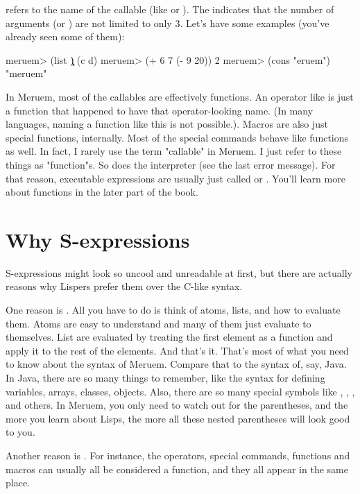  refers to the name of the callable (like  or \code{++}). The  indicates that the number of arguments (or ) are not limited to only 3. Let's have some examples (you've already seen some of them):

\begin{REPL}
meruem> (list \c \d)
(c d)
meruem> (+ 6 7 (- 9 20))
2
meruem> (cons \m "eruem")
"meruem"
\end{REPL}

In Meruem, most of the callables are effectively functions. An operator like \code{+} is just a function that happened to have that operator-looking name. (In many languages, naming a function like this is not possible.). Macros are also just special functions, internally. Most of the special commands behave like functions as well. In fact, I rarely use the term "callable" in Meruem. I just refer to these things as "function"s. So does the interpreter (see the last error message). For that reason, executable expressions are usually just called  or . You'll learn more about functions in the later part of the book.

\section{Why S-expressions}
S-expressions might look so uncool and unreadable at first, but there are actually reasons why Lispers prefer them over the C-like syntax. 

One reason is . All you have to do is think of atoms, lists, and how to evaluate them. Atoms are easy to understand and many of them just evaluate to themselves. List are evaluated by treating the first element as a function and apply it to the rest of the elements. And that's it. That's most of what you need to know about the syntax of Meruem. Compare that to the syntax of, say, Java. In Java, there are so many things to remember, like the syntax for defining variables, arrays, classes, objects. Also, there are so many special symbols like \code{()}, \code{[]}, \code{<>}, \code{\{\}} and others. In Meruem, you only need to watch out for the parentheses, and the more you learn about Lisps, the more all these nested parentheses will look good to you.

Another reason is . For instance, the operators, special commands, functions and macros can usually all be considered a function, and they all appear in the same place. 


